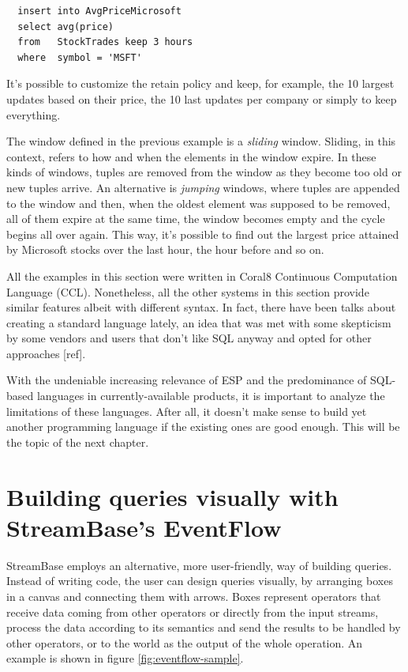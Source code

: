 \documentclass{report}
\begin{document}
\begin{lstlisting}
  insert into AvgPriceMicrosoft
  select avg(price)
  from   StockTrades keep 3 hours
  where  symbol = 'MSFT'
\end{lstlisting}

It's possible to customize the retain policy and keep, for example,
the 10 largest updates based on their price, the 10 last updates per
company or simply to keep everything.

The window defined in the previous example is a \emph{sliding}
window. Sliding, in this context, refers to how and when the elements
in the window expire. In these kinds of windows, tuples are removed
from the window as they become too old or new tuples arrive. An
alternative is \emph{jumping} windows, where tuples are appended to
the window and then, when the oldest element was supposed to be
removed, all of them expire at the same time, the window becomes empty
and the cycle begins all over again. This way, it's possible to find
out the largest price attained by Microsoft stocks over the last hour,
the hour before and so on.

All the examples in this section were written in Coral8 Continuous
Computation Language (CCL). Nonetheless, all the other systems in this
section provide similar features albeit with different syntax. In
fact, there have been talks about creating a standard language lately,
an idea that was met with some skepticism by some vendors and users
that don't like SQL anyway and opted for other approaches [ref].

With the undeniable increasing relevance of ESP and the predominance
of SQL-based languages in currently-available products, it is
important to analyze the limitations of these languages. After all, it
doesn't make sense to build yet another programming language if the
existing ones are good enough. This will be the topic of the next
chapter.

\section{Building queries visually with StreamBase's EventFlow}
\label{sec:eventflow}

StreamBase employs an alternative, more user-friendly, way of building
queries. Instead of writing code, the user can design queries
visually, by arranging boxes in a canvas and connecting them with
arrows. Boxes represent operators that receive data coming from other
operators or directly from the input streams, process the data
according to its semantics and send the results to be handled by other
operators, or to the world as the output of the whole operation. An
example is shown in figure \ref{fig:eventflow-sample}.
\end{document}
